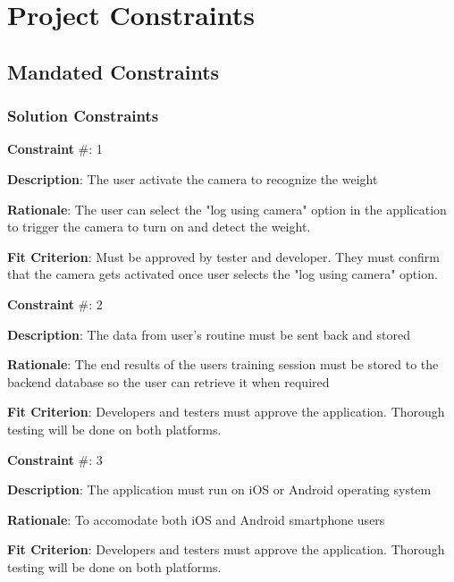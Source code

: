 \documentclass{article}
\begin{document}
\newpage
\section{Project Constraints}

\subsection{Mandated Constraints}
\subsubsection{Solution Constraints}

\textbf{Constraint} \#: 1

\textbf{Description}: The user activate the camera to recognize the weight 

\textbf{Rationale}: The user can select the "log using camera" option in the application to trigger the camera to turn on and detect the weight.

\textbf{Fit Criterion}: Must be approved by tester and developer. They must confirm that the camera gets activated once user selects the "log using camera" option. 

\medskip

\textbf{Constraint} \#: 2

\textbf{Description}: The data from user’s routine must be sent back and stored

\textbf{Rationale}: The end results of the users training session must be stored to the backend database so the user can retrieve it when required

\textbf{Fit Criterion}: Developers and testers must approve the application. Thorough testing will be done on both platforms.

\medskip

\textbf{Constraint} \#: 3

\textbf{Description}: The application must run on iOS or Android operating system

\textbf{Rationale}: To accomodate both iOS and Android smartphone users

\textbf{Fit Criterion}: Developers and testers must approve the application. Thorough testing will be done on both platforms.

\medskip

\end{document}

